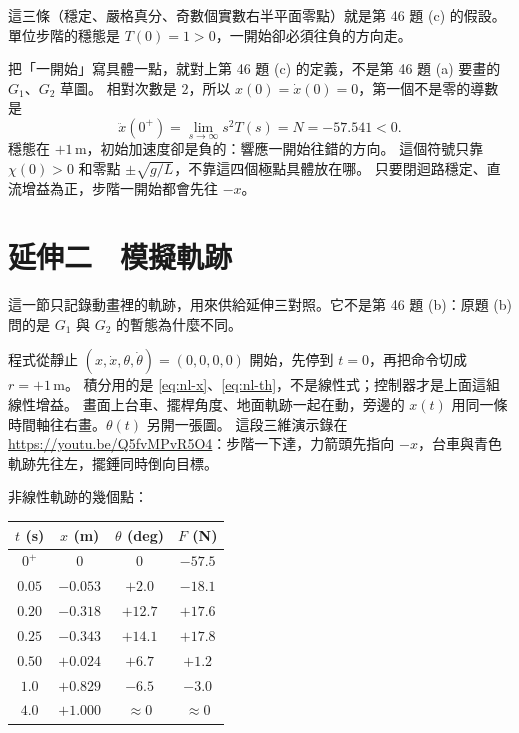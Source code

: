 \documentclass[12pt,a4paper]{article}
\begin{document}
這三條（穩定、嚴格真分、奇數個實數右半平面零點）就是第 46 題 (c) 的假設。
單位步階的穩態是 \(T(0)=1>0\)，一開始卻必須往負的方向走。

把「一開始」寫具體一點，就對上第 46 題 (c) 的定義，不是第 46 題 (a) 要畫的 \(G_1\)、\(G_2\) 草圖。
相對次數是 \(2\)，所以 \(x(0)=\dot x(0)=0\)，第一個不是零的導數是
\[
  \ddot x(0^+)=\lim_{s\to\infty}s^2T(s)=N=-57.541<0.
\]
穩態在 \(+1\,\mathrm{m}\)，初始加速度卻是負的：響應一開始往錯的方向。
這個符號只靠 \(\chi(0)>0\) 和零點 \(\pm\sqrt{g/L}\)，不靠這四個極點具體放在哪。
只要閉迴路穩定、直流增益為正，步階一開始都會先往 \(-x\)。

\section{延伸二　模擬軌跡}

這一節只記錄動畫裡的軌跡，用來供給延伸三對照。它不是第 46 題 (b)：原題 (b) 問的是 \(G_1\) 與 \(G_2\) 的暫態為什麼不同。

程式從靜止 \((x,\dot x,\theta,\dot\theta)=(0,0,0,0)\) 開始，先停到 \(t=0\)，再把命令切成 \(r=+1\,\mathrm{m}\)。
積分用的是 \eqref{eq:nl-x}、\eqref{eq:nl-th}，不是線性式；控制器才是上面這組線性增益。
畫面上台車、擺桿角度、地面軌跡一起在動，旁邊的 \(x(t)\) 用同一條時間軸往右畫。\(\theta(t)\) 另開一張圖。
這段三維演示錄在 \url{https://youtu.be/Q5fvMPvR5O4}：步階一下達，力箭頭先指向 \(-x\)，台車與青色軌跡先往左，擺錘同時倒向目標。

非線性軌跡的幾個點：

\begin{center}
\begin{tabular}{@{}cccc@{}}
\toprule
\(t\) (s) & \(x\) (m) & \(\theta\) (deg) & \(F\) (N) \\
\midrule
\(0^+\)   & \(0\)      & \(0\)        & \(-57.5\) \\
\(0.05\)  & \(-0.053\) & \(+2.0\)     & \(-18.1\) \\
\(0.20\)  & \(-0.318\) & \(+12.7\)    & \(+17.6\) \\
\(0.25\)  & \(-0.343\) & \(+14.1\)    & \(+17.8\) \\
\(0.50\)  & \(+0.024\) & \(+6.7\)     & \(+1.2\) \\
\(1.0\)   & \(+0.829\) & \(-6.5\)     & \(-3.0\) \\
\(4.0\)   & \(+1.000\) & \(\approx 0\) & \(\approx 0\) \\
\bottomrule
\end{tabular}
\end{center}
\end{document}
